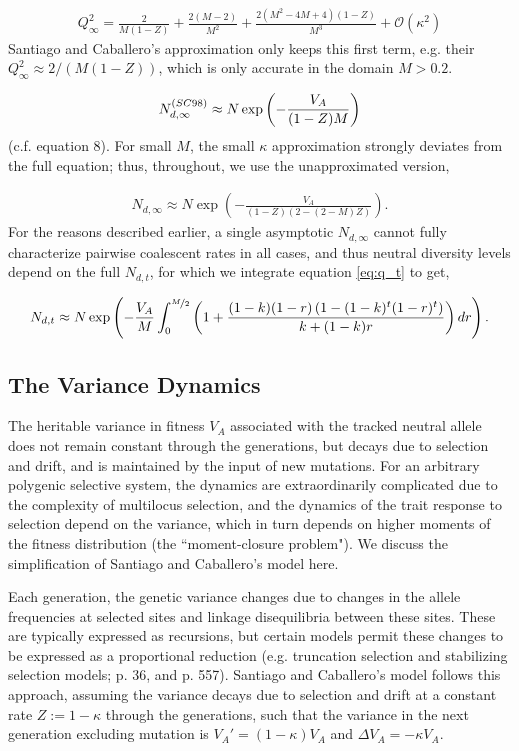 \documentclass[11pt]{article}
\begin{document}
\begin{align}
  Q_\infty^2 = \frac{2}{M (1-Z)} + \frac{2 (M-2)}{M^2}+\frac{2 \left(M^2-4 M+4\right) (1-Z)}{M^3} + \mathcal{O}(\kappa^2)
\end{align}
%
Santiago and Caballero's approximation only keeps this first term, e.g. their
$Q_\infty^2 \approx 2/(M(1-Z))$, which is only accurate in the domain $M >
0.2$. 

\begin{align}
  N_{d,\infty}^{\text(SC98)} \approx N \exp\left(-\frac{V_A}{(1-Z)M}\right) 
\end{align}
%
(c.f. \cite{Santiago1998-bs} equation 8). For small $M$, the small $\kappa$
approximation strongly deviates from the full equation; thus, throughout, we
use the unapproximated version,

\begin{align}
  \label{eq:Ne_inf}
  N_{d,\infty} \approx N \exp\left(-\frac{V_A}{(1-Z) (2-(2-M) Z)} \right).
\end{align}
%
For the reasons described earlier, a single asymptotic $N_{d,\infty}$ cannot
fully characterize pairwise coalescent rates in all cases, and thus neutral
diversity levels depend on the full $N_{d,t}$, for which we integrate equation
\eqref{eq:q_t} to get,

\begin{align}
  \label{eq:net_integral}
  N_{d,t} \approx N \exp\left(-\frac{V_A}{M} \int_0^{\nicefrac{M}{2}} \left(1+\frac{(1-k) (1-r) \left(1-(1-k)^t (1-r)^t\right)}{k+(1-k)r} \right) dr \right).
\end{align}

\subsection{The Variance Dynamics}

The heritable variance in fitness $V_A$ associated with the tracked neutral
allele does not remain constant through the generations, but decays due to
selection and drift, and is maintained by the input of new mutations. For an
arbitrary polygenic selective system, the dynamics are extraordinarily
complicated due to the complexity of multilocus selection, and the dynamics of
the trait response to selection depend on the variance, which in turn depends
on higher moments of the fitness distribution (the ``moment-closure problem").
We discuss the simplification of Santiago and Caballero's model here.

Each generation, the genetic variance changes due to changes in the allele
frequencies at selected sites and linkage disequilibria between these sites.
These are typically expressed as recursions, but certain models permit these
changes to be expressed as a proportional reduction (e.g. truncation selection
and stabilizing selection models; \cite{Keightley1988-eq} p. 36, and
\cite{Walsh2018-bt} p. 557). Santiago and Caballero's model follows this
approach, assuming the variance decays due to selection and drift at a constant
rate $Z := 1-\kappa$ through the generations, such that the variance in the next
generation excluding mutation is $V_A' = (1-\kappa) V_A$ and $\Delta V_A =
-\kappa V_A$.
\end{document}
